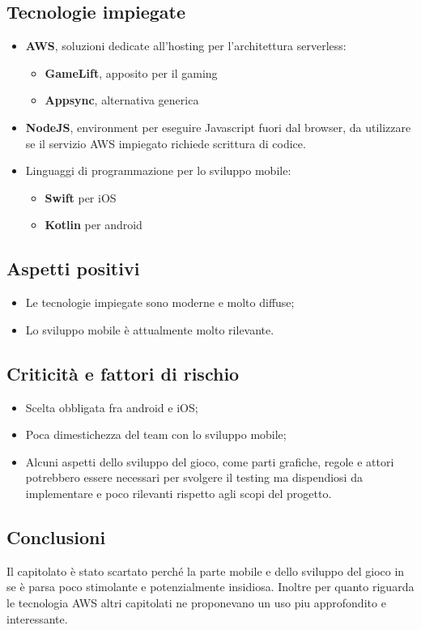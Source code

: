\subsection{Tecnologie impiegate}
\begin{itemize}
    \item \textbf{AWS}, soluzioni dedicate all'hosting per l'architettura serverless:
    \begin{itemize}
        \item \textbf{GameLift}, apposito per il gaming
        \item \textbf{Appsync}, alternativa generica
    \end{itemize}
    \item \textbf{NodeJS}, environment per eseguire Javascript fuori dal browser, da utilizzare se il servizio AWS impiegato richiede scrittura di codice.
    \item Linguaggi di programmazione per lo sviluppo mobile: 
    \begin{itemize}
        \item \textbf{Swift} per iOS
        \item \textbf{Kotlin} per android
    \end{itemize}
\end{itemize}
\subsection{Aspetti positivi}
\begin{itemize}
    \item Le tecnologie impiegate sono moderne e molto diffuse;
    \item Lo sviluppo mobile \`e attualmente molto rilevante.
\end{itemize}
\subsection{Criticit\`a e fattori di rischio}
\begin{itemize}
    \item Scelta obbligata fra android e iOS;
    \item Poca dimestichezza del team con lo sviluppo mobile;
    \item Alcuni aspetti dello sviluppo del gioco, come parti grafiche, regole e attori potrebbero essere necessari per svolgere il testing ma dispendiosi da implementare e poco rilevanti rispetto agli scopi del progetto.
\end{itemize}
\subsection{Conclusioni}
Il capitolato \`e stato scartato perch\'e la parte mobile e dello sviluppo del gioco in se \`e parsa poco stimolante e potenzialmente insidiosa. Inoltre per quanto riguarda le tecnologia AWS altri capitolati ne proponevano un uso piu approfondito e interessante.